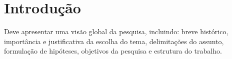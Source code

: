 
\chapter{Introdu\c{c}\~ao}\label{cap:introducao}

Deve apresentar uma vis\~ao global da pesquisa, incluindo: breve hist\'orico, import\^ancia e justificativa da escolha do tema, delimita\c{c}\~oes do assunto, formula\c{c}\~ao de hip\'oteses, objetivos da pesquisa e estrutura do trabalho.
